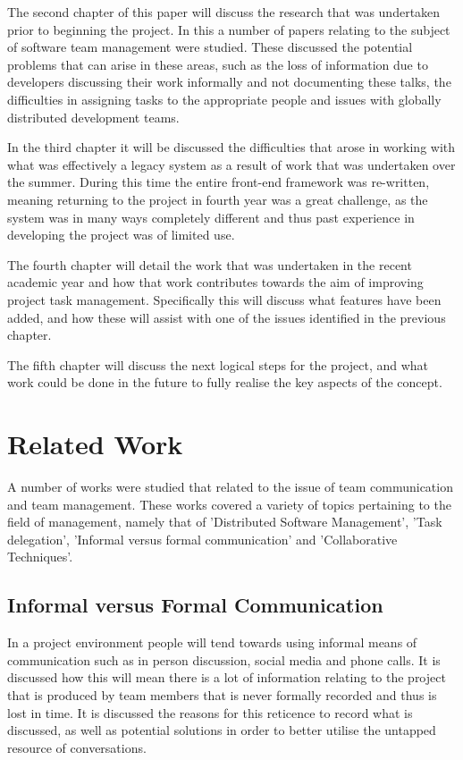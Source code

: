 \documentclass{l4proj}
\begin{document}
The second chapter of this paper will discuss the research that was undertaken prior to beginning the project. In this a number of papers relating to the subject of software team management were studied.  These discussed the potential problems that can arise in these areas, such as the loss of information due to developers discussing their work informally and not documenting these talks, the difficulties in assigning tasks to the appropriate people and issues with globally distributed development teams.

In the third chapter it will be discussed the difficulties that arose in working with what was effectively a legacy system as a result of work that was undertaken over the summer.  During this time the entire front-end framework was re-written, meaning returning to the project in fourth year was a great challenge, as the system was in many ways completely different and thus past experience in developing the project was of limited use.  

The fourth chapter will detail the work that was undertaken in the recent academic year and how that work contributes towards the aim of improving project task management. Specifically this will discuss what features have been added, and how these will assist with one of the issues identified in the previous chapter.

The fifth chapter will discuss the next logical steps for the project, and what work could be done in the future to fully realise the key aspects of the concept.


\chapter{Related Work}
A number of works were studied that related to the issue of team communication and team management.  These works covered a variety of topics pertaining to the field of management, namely that of 'Distributed Software Management', 'Task delegation', 'Informal versus formal communication' and 'Collaborative Techniques'.

\section {Informal versus Formal Communication}

In a project environment people will tend towards using informal means of communication such as in person discussion, social media and phone calls.  It is discussed how this will mean there is a lot of information relating to the project that is produced by team members that is never formally recorded and thus is lost in time.  It is discussed the reasons for this reticence to record what is discussed, as well as potential solutions in order to better utilise the untapped resource of conversations.
\end{document}

